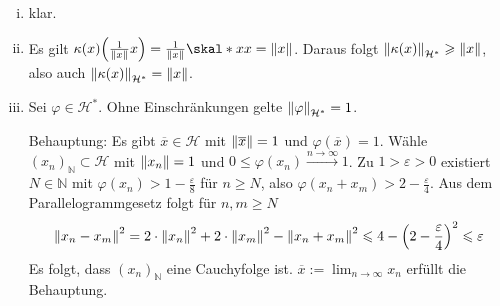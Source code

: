\begin{enumerate}[(i)]
	\item klar.
	\item Es gilt $\kappa(x) \enbrace*{\frac{1}{\norm{x}}x }= \frac{1}{\norm{x}} \skal*{x}{x} = \norm{x}$. Daraus folgt $\norm[\mathcal{H}^*]{\kappa(x)} \ge \norm{x}$, also
	auch $\norm[\mathcal{H}^*]{\kappa(x)}= \norm{x}$.
	\item Sei $\varphi \in \mathcal{H}^*$. Ohne Einschränkungen gelte $\norm[\mathcal{H}^*]{\varphi}=1$. 
	
	Behauptung: Es gibt $\overline{x} \in \mathcal{H}$ mit $\norm{\overline{x}}=1 $ und
	$\varphi(\overline{x} )=1$. Wähle $(x_n)_\mathds{N} \subset \mathcal{H}$ mit $\norm{x_n}=1$ und $0\le \varphi(x_n) \xrightarrow{n \to \infty} 1$.
	Zu $1 >\varepsilon>0$ existiert $N \in \mathds{N}$ mit $\varphi(x_n) > 1- \frac{\varepsilon}{8} $ für $n \ge N$, also $\varphi(x_n +x_m) > 2- \frac{\varepsilon}{4}$.
	Aus dem Parallelogrammgesetz folgt für $n,m \ge N$
	\begin{align*}
		\norm{x_n -x_m}^2 = 2 \cdot \norm{x_n}^2 + 2 \cdot \norm{x_m}^2 - \norm{x_n +x_m}^2 \le 4 - \enbrace*{2-\frac{\varepsilon}{4} }^2 \le \varepsilon 
	\end{align*}
	Es folgt, dass $(x_n)_\mathds{N}$ eine Cauchyfolge ist. $\overline{x} := \lim_{ n \to \infty} x_n$ erfüllt die Behauptung.
	

\end{enumerate}
